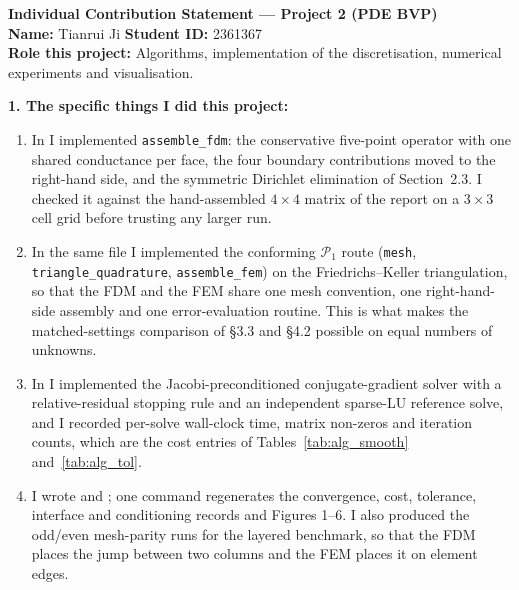 \clearpage
\begin{formbox}
\small
\textbf{Individual Contribution Statement --- Project 2 (PDE BVP)}\\[0.3em]
\textbf{Name:} Tianrui Ji \hfill \textbf{Student ID:} 2361367\\
\textbf{Role this project:} Algorithms, implementation of the discretisation,
numerical experiments and visualisation.

\textbf{1. The specific things I did this project:}
\begin{enumerate}[leftmargin=1.5em,itemsep=1pt,topsep=2pt]
    \item In  I implemented \texttt{assemble\_fdm}:
    the conservative five-point operator with one shared conductance per face,
    the four boundary contributions moved to the right-hand side, and the
    symmetric Dirichlet elimination of Section~2.3. I checked it against the
    hand-assembled $4\times4$ matrix of the report on a $3\times3$ cell grid
    before trusting any larger run.
    \item In the same file I implemented the conforming $\mathcal P_1$ route
    (\texttt{mesh}, \texttt{triangle\_quadrature}, \texttt{assemble\_fem}) on
    the Friedrichs--Keller triangulation, so that the FDM and the FEM share one
    mesh convention, one right-hand-side assembly and one error-evaluation
    routine. This is what makes the matched-settings comparison of \S3.3 and
    \S4.2 possible on equal numbers of unknowns.
    \item In  I implemented the Jacobi-preconditioned
    conjugate-gradient solver with a relative-residual stopping rule and an
    independent sparse-LU reference solve, and I recorded per-solve wall-clock
    time, matrix non-zeros and iteration counts, which are the cost entries of
    Tables~\ref{tab:alg_smooth} and~\ref{tab:alg_tol}.
    \item I wrote  and ; one command
    regenerates the convergence, cost, tolerance, interface and conditioning
    records and Figures 1--6. I also produced the odd/even mesh-parity runs for
    the layered benchmark, so that the FDM places the jump between two columns
    and the FEM places it on element edges.
\end{enumerate}


\end{formbox}

